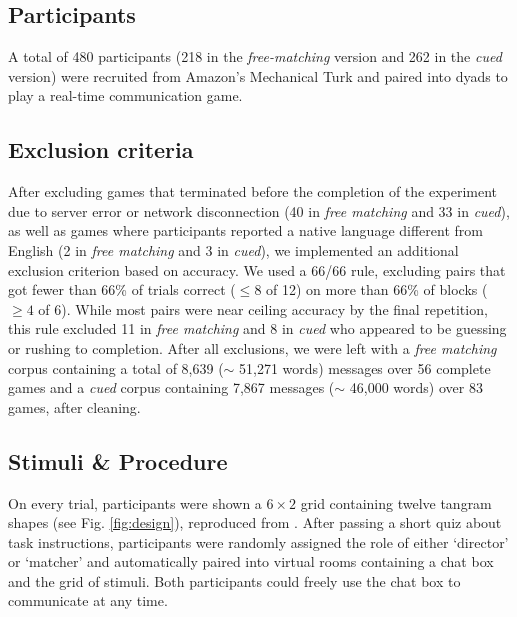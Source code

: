 \documentclass[alpha-refs]{wiley-article}
\begin{document}
\subsection{Participants}\label{participants}

A total of 480 participants (218 in the \emph{free-matching} version and 262 in the \emph{cued} version) were recruited from Amazon's Mechanical Turk and paired into dyads to play a real-time communication game. 

\subsection{Exclusion criteria}

After excluding games that terminated before the completion of the experiment due to server error or network disconnection (40 in \emph{free matching} and 33 in \emph{cued}), as well as games where participants reported a native language different from English (2 in \emph{free matching} and 3 in \emph{cued}), we implemented an additional exclusion criterion based on accuracy. 
We used a 66/66 rule, excluding pairs that got fewer than 66\% of trials correct ($\le8$ of 12)  on more than 66\% of blocks ($\ge4$ of 6). 
While most pairs were near ceiling accuracy by the final repetition, this rule excluded 11 in \emph{free matching} and 8 in \emph{cued} who appeared to be guessing or rushing to completion. 
After all exclusions, we were left with a \emph{free matching} corpus containing a total of 8,639 ($\sim$ 51,271 words) messages over 56 complete games and a \emph{cued} corpus containing 7,867 messages ($\sim$ 46,000 words) over 83 games, after cleaning.

\subsection{Stimuli \& Procedure}\label{stimuli}

On every trial, participants were shown a \(6 \times 2\) grid containing twelve tangram shapes (see Fig. \ref{fig:design}), reproduced from \cite{ClarkWilkesGibbs86_ReferringCollaborative}.  
After passing a short quiz about task instructions, participants were randomly assigned the role of either `director' or `matcher' and automatically paired into virtual rooms containing a chat box and the grid of stimuli. 
Both participants could freely use the chat box to communicate at any time. 
\end{document}
